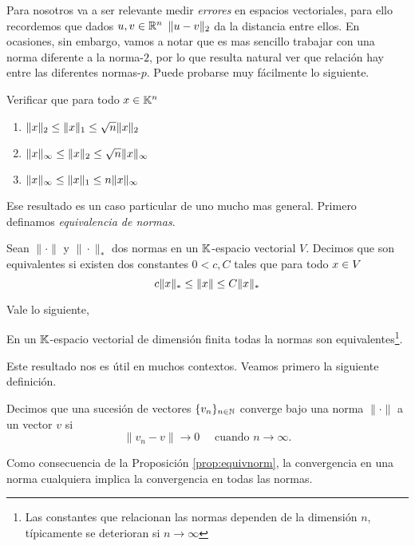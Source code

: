 %
Para nosotros va a ser relevante medir \emph{errores} en espacios vectoriales, para ello recordemos que dados $\ub,\vb\in \R^n$
$\|\ub-\vb\|_2$ da la distancia entre ellos. En ocasiones, sin embargo, vamos a notar que es mas sencillo trabajar con una norma diferente a la norma-$2$, por lo que resulta natural ver que relación hay entre las diferentes normas-$p$. Puede probarse muy fácilmente lo siguiente.
\begin{ejercicio}
Verificar que para todo $\xb\in \K^n$
\begin{enumerate}
\item $\|\xb\|_2 \le \|\xb\|_1 \le \sqrt{n} \|\xb\|_2$
\item $\|\xb\|_\infty \le \|\xb\|_2 \le \sqrt{n} \|\xb\|_\infty$
\item $\|\xb\|_\infty \le \|\xb\|_1 \le n \|\xb\|_\infty$
\end{enumerate}
\end{ejercicio}
Ese resultado es un caso particular de uno mucho mas general. Primero definamos \emph{equivalencia de normas}.
\tccdefi
\begin{definicion}
 Sean $\|\cdot\|$ y $\|\cdot\|_{*}$ dos normas en un $\mathbb K$-espacio vectorial $V$. Decimos que son equivalentes si existen dos constantes $0<c,C$ tales que para todo $\xb\in V$
 $$
 c\|\xb\|_* \le \|\xb\| \le C \|\xb\|_*
 $$
\end{definicion}
\etcc
Vale lo siguiente,
\begin{proposicion}
\label{prop:equivnorm}
 En un $\mathbb K$-espacio vectorial de dimensión finita todas la normas son equivalentes\footnote{Las constantes que relacionan las normas dependen de la dimensión $n$, típicamente se deterioran si $n\to \infty$}.
\end{proposicion}
Este resultado nos es útil en muchos contextos.  Veamos primero la siguiente definición.
\tccdefi
\begin{definicion}
Decimos que una sucesi\'on de vectores $\{v_n\}_{n \in \mathbb N}$ converge bajo una norma $\|\cdot\|$ a un vector $v$ si
$$
\|v_n - v\| \rightarrow 0 \quad \text{ cuando } n \rightarrow \infty.
$$
\end{definicion}
\etcc
Como consecuencia de la Proposición \ref{prop:equivnorm}, la convergencia en una norma cualquiera implica la convergencia en todas las normas.

